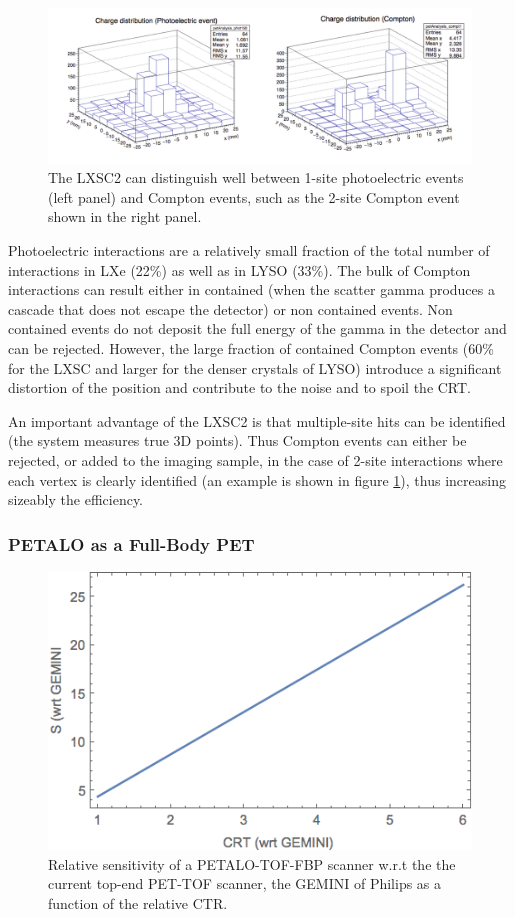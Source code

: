 \begin{figure}[!htbp]
	\centering
	\includegraphics[scale=0.6]{img/Compton.png}
	\caption{The LXSC2 can distinguish well between 1-site photoelectric events (left panel) and
	Compton events, such as the 2-site Compton event shown in the right panel.}\label{fig.Compton} 
\end{figure}

Photoelectric interactions are a relatively small fraction of the total number of interactions in LXe (22\%) as well as in LYSO (33\%). The bulk of Compton interactions can result either in contained (when the scatter gamma produces a cascade that does not escape the detector) or non contained events. Non contained events do not deposit the full energy of the gamma in the detector and can be rejected. However, the large fraction of contained Compton events (60\% for the LXSC and larger for the denser crystals of LYSO) introduce a significant distortion of the position and contribute to the noise and to spoil the CRT. 

An important advantage of the LXSC2 is that multiple-site hits can be identified (the system measures true 3D points). Thus Compton events can either be rejected, or added to the imaging sample, in the case of 2-site interactions where each vertex is clearly identified (an example is shown in figure \ref{fig.Compton}), thus increasing sizeably the efficiency.  
%

\subsubsection*{PETALO as a Full-Body PET}
%
\begin{figure}[!htb]
	\centering
	\includegraphics[scale=0.6]{img/RelativeSensitivity.png}
	\caption{\label{fig.rsensi} Relative sensitivity of a PETALO-TOF-FBP scanner w.r.t the the current top-end PET-TOF scanner, the GEMINI of Philips as a function of the relative CTR.  }
\end{figure}


